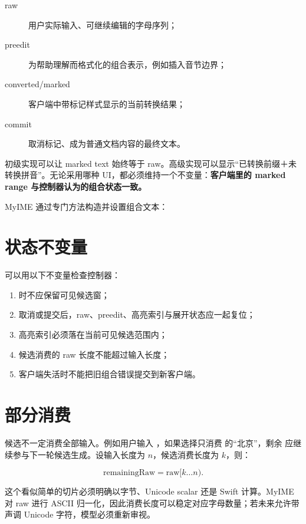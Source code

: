 \begin{description}
  \item[raw] 用户实际输入、可继续编辑的字母序列；
  \item[preedit] 为帮助理解而格式化的组合表示，例如插入音节边界；
  \item[converted/marked] 客户端中带标记样式显示的当前转换结果；
  \item[commit] 取消标记、成为普通文档内容的最终文本。
\end{description}

初级实现可以让 marked text 始终等于 raw。高级实现可以显示“已转换前缀＋未转换拼音”。无论采用哪种 UI，都必须维持一个不变量：\textbf{客户端里的 marked range 与控制器认为的组合状态一致。}

MyIME 通过专门方法构造并设置组合文本：



\section{状态不变量}

可以用以下不变量检查控制器：

\begin{enumerate}
  \item {} 时不应保留可见候选窗；
  \item 取消或提交后，raw、preedit、高亮索引与展开状态应一起复位；
  \item 高亮索引必须落在当前可见候选范围内；
  \item 候选消费的 raw 长度不能超过输入长度；
  \item 客户端失活时不能把旧组合错误提交到新客户端。
\end{enumerate}

\section{部分消费}

候选不一定消费全部输入。例如用户输入 ，如果选择只消费  的“北京”，剩余  应继续参与下一轮候选生成。设输入长度为 \(n\)，候选消费长度为 \(k\)，则：

\[
  \text{remainingRaw}=\text{raw}[k\ldots n).
\]

这个看似简单的切片必须明确以字节、Unicode scalar 还是 Swift  计算。MyIME 对 raw 进行 ASCII 归一化，因此消费长度可以稳定对应字母数量；若未来允许带声调 Unicode 字符，模型必须重新审视。

